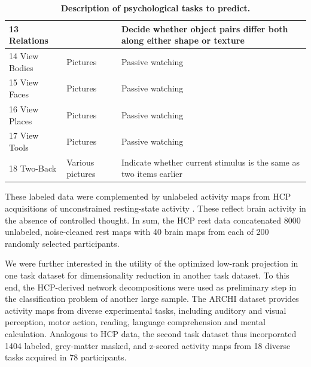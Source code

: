 \documentclass{article} %
\begin{document}
\begin{table}[h]
{\begin{tabular}{l|l|l}
  13 Relations         &                                       & Decide whether object pairs differ both along either shape or texture             \\ \hline
  14 View Bodies       & Pictures                              & Passive watching                                                                   \\ \hline
  15 View Faces        & Pictures                              & Passive watching                                                                   \\ \hline
  16 View Places       & Pictures                              & Passive watching                                                                   \\ \hline
  17 View Tools        & Pictures                              & Passive watching                                                                   \\ \hline
  18 Two-Back          & Various pictures                      & Indicate whether current stimulus is the same as two items earlier                \\ \hline
  \end{tabular}
}
\vspace{-0.2cm}
\caption{\textbf{Description of psychological tasks to predict.}}
\label{table_tasks}
\end{table}

These labeled data were complemented by unlabeled activity maps
from HCP acquisitions of unconstrained resting-state activity
\cite{smith2013resting}.
These reflect brain activity in the absence of controlled thought.
In sum, the HCP rest data concatenated
8000 unlabeled, noise-cleaned rest maps with
40 brain maps from each of 200 randomly selected participants.

We were further interested in the utility of the
optimized low-rank projection
in one task dataset for dimensionality reduction in another task dataset.
To this end, the HCP-derived network decompositions were used as preliminary
step in the classification problem of another large sample.
The ARCHI dataset \cite{pinel07} provides activity maps from
diverse experimental tasks, including auditory and visual perception, motor action,
reading, language comprehension and mental calculation.
Analogous to HCP data, the second task dataset thus incorporated 1404
labeled, grey-matter masked, and z-scored activity maps
from 18 diverse tasks acquired in 78 participants.
\end{document}
